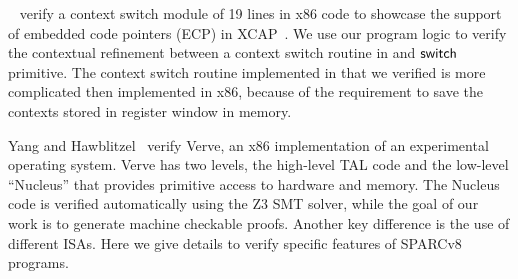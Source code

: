 
~\cite{ctxm} verify a context switch module of 19 lines
in x86 code to showcase the support of embedded
code pointers (ECP) in XCAP~\cite{xcap}.
We use our program logic to verify the contextual
refinement between a context switch routine in \sparc{}
and $\mathsf{switch}{}$ primitive. The context switch routine
implemented in \sparc{} that we verified
is more complicated then
implemented in x86, because of the requirement to save
the contexts stored in register window in memory.

Yang and Hawblitzel~\cite{YangPLDI10} verify Verve, an x86
implementation of an experimental operating system. Verve has two
levels, the high-level TAL code and the low-level ``Nucleus''
that provides primitive access to hardware and memory.
The Nucleus code is verified automatically using the Z3 SMT solver,
while the goal of our work is to generate machine checkable proofs.
Another key difference is the use of different ISAs. Here
we give details to verify specific features of SPARCv8 programs.


